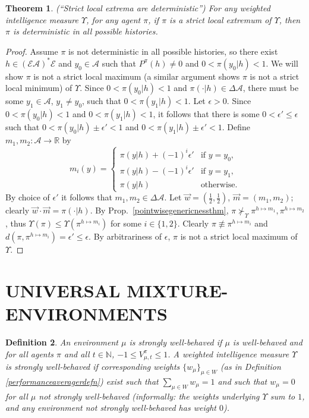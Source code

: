 \documentclass[twoside]{article}
\newtheorem{theorem}{Theorem}
\newtheorem{definition}[theorem]{Definition}
\begin{document}
\begin{theorem}
\label{extremitythm}
    (``Strict local extrema are deterministic'')
    For any weighted intelligence measure $\Upsilon$, for any agent $\pi$,
    if $\pi$ is a strict local extremum of $\Upsilon$, then
    $\pi$ is deterministic in all possible histories.
\end{theorem}

\begin{proof}
    Assume $\pi$ is not deterministic in all possible histories, so there exist
    $h\in(\mathcal E\mathcal A)^*\mathcal E$ and $y_0\in\mathcal A$
    such that $P^\pi(h)\not=0$ and $0<\pi(y_0|h)<1$.
    We will show $\pi$ is not a strict local maximum (a similar argument
    shows $\pi$ is not a strict local minimum) of $\Upsilon$.
    Since $0<\pi(y_0|h)<1$ and $\pi(\cdot|h)\in\Delta\mathcal A$,
    there must be some $y_1\in\mathcal A$, $y_1\not=y_0$, such that
    $0<\pi(y_1|h)<1$. Let $\epsilon>0$.
    Since $0<\pi(y_0|h)<1$ and $0<\pi(y_1|h)<1$, it follows
    that there is some $0<\epsilon'\leq \epsilon$
    such that $0<\pi(y_0|h)\pm\epsilon'<1$ and $0<\pi(y_1|h)\pm\epsilon'<1$.
    Define $m_1,m_2:\mathcal A\to \mathbb R$ by
    \[
        m_i(y) = \begin{cases}
            \pi(y|h)+(-1)^i\epsilon' &\mbox{if $y=y_0$,}\\
            \pi(y|h)-(-1)^i\epsilon' &\mbox{if $y=y_1$,}\\
            \pi(y|h) &\mbox{otherwise.}
        \end{cases}
    \]
    By choice of $\epsilon'$ it follows that $m_1,m_2\in\Delta\mathcal A$.
    Let $\vec w=(\frac12,\frac12)$, $\vec m=(m_1,m_2)$;
    clearly $\vec w\cdot\vec m=\pi(\cdot|h)$.
    By Prop.\ \ref{pointwisegenericnessthm},
    $\pi\not\succ_\Upsilon \pi^{h\mapsto m_1},\pi^{h\mapsto m_2}$,
    thus $\Upsilon(\pi)\leq \Upsilon(\pi^{h\mapsto m_i})$
    for some $i\in\{1,2\}$.
    Clearly $\pi\not\equiv \pi^{h\mapsto m_i}$
    and $d(\pi,\pi^{h\mapsto m_i})=\epsilon'\leq\epsilon$.
    By arbitrariness of $\epsilon$,
    $\pi$ is not a strict local maximum of $\Upsilon$.
\end{proof}

\section{UNIVERSAL MIXTURE-ENVIRONMENTS}

\begin{definition}
\label{stronglywellbehaveddefn}
    An environment $\mu$ is \emph{strongly well-behaved} if
    $\mu$ is well-behaved and for all agents $\pi$ and all
    $t\in\mathbb N$, $-1\leq V^\pi_{\mu,t}\leq 1$.
    A weighted intelligence measure $\Upsilon$ is \emph{strongly well-behaved}
    if corresponding weights $\{w_\mu\}_{\mu\in W}$
    (as in Definition \ref{performanceaveragerdefn}) exist such that
    $\sum_{\mu\in W}w_\mu=1$ and such that
    $w_\mu=0$ for all $\mu$ not strongly well-behaved (informally: the weights
    underlying $\Upsilon$ sum to $1$, and any environment not strongly
    well-behaved has weight $0$).
\end{definition}
\end{document}
